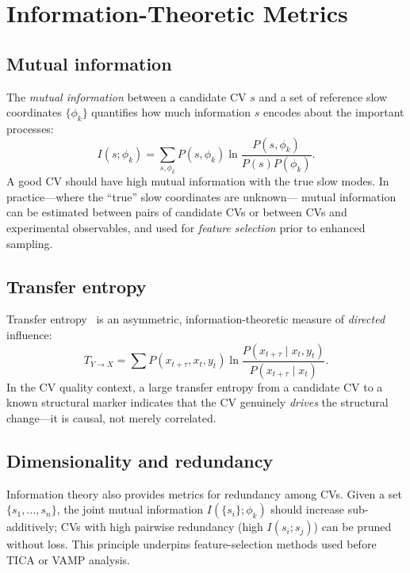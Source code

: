 \documentclass[12pt, a4paper]{article}
\begin{document}
\section{Information-Theoretic Metrics}
\label{sec:infotheory}

\subsection{Mutual information}

The \emph{mutual information} between a candidate CV $s$ and a set 
of reference slow coordinates $\{\phi_k\}$ quantifies how much 
information $s$ encodes about the important processes:
\begin{equation}
  I(s;\phi_k) = \sum_{s,\phi_k} P(s,\phi_k)\ln\frac{P(s,\phi_k)}{P(s)P(\phi_k)}.
\end{equation}
A good CV should have high mutual information with the true slow 
modes.  In practice---where the ``true'' slow coordinates are unknown---
mutual information can be estimated between pairs of candidate CVs 
or between CVs and experimental observables, and used for 
\emph{feature selection} prior to enhanced sampling.

\subsection{Transfer entropy}

Transfer entropy~\citep{Schreiber2000} is an asymmetric, 
information-theoretic measure of \emph{directed} influence:
\begin{equation}
  T_{Y\to X} = \sum P(x_{t+\tau},x_{t},y_{t})\ln
    \frac{P(x_{t+\tau}\mid x_{t},y_{t})}{P(x_{t+\tau}\mid x_{t})}.
\end{equation}
In the CV quality context, a large transfer entropy from a candidate 
CV to a known structural marker indicates that the CV genuinely 
\emph{drives} the structural change---it is causal, not merely 
correlated.

\subsection{Dimensionality and redundancy}

Information theory also provides metrics for redundancy among CVs.  
Given a set $\{s_1,\ldots,s_n\}$, the joint mutual information 
$I(\{s_i\};\phi_k)$ should increase sub-additively; CVs with high 
pairwise redundancy (high $I(s_i;s_j)$) can be pruned without loss.  
This principle underpins feature-selection methods used before TICA 
or VAMP analysis.
\end{document}
